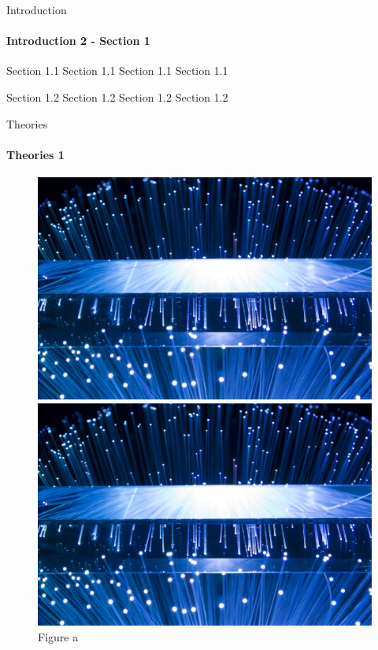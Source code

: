 \documentclass[t]{beamer}
\begin{document}
\begin{frame}{Introduction}
\framesubtitle{Introduction 2 - Section 1}
\label{P4 Introduction}

\begin{block}{Section 1.1}
    Section 1.1 Section 1.1 Section 1.1
\end{block}
\begin{block}{Section 1.2}
    Section 1.2 Section 1.2 Section 1.2
\end{block}

\end{frame}


\begin{frame}{Theories}
\framesubtitle{Theories 1}
\label{P5 Theories}

\begin{center}
    \begin{figure}[htbp]
        \centering
        \begin{minipage}[t]{0.3\textwidth}
            \centering
            \includegraphics[width=\textwidth]{image/a}
                    \caption*{Figure a}
        \end{minipage}
    \hfill
        \begin{minipage}[t]{0.3\textwidth}
            \centering
            \includegraphics[width=\textwidth]{image/a}

\end{minipage}
\end{figure}
\end{center}
\end{frame}
\end{document}
